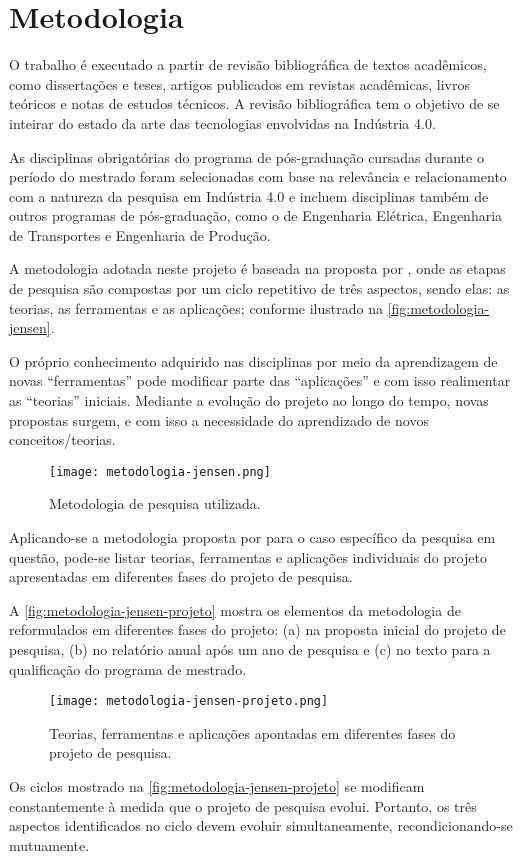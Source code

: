 \chapter{Metodologia}
\label{cha:metodologia}

	O trabalho é executado a partir de revisão bibliográfica de textos acadêmicos, como dissertações e teses, artigos publicados em revistas acadêmicas, livros teóricos e notas de estudos técnicos. A revisão bibliográfica tem o objetivo de se inteirar do estado da arte das tecnologias envolvidas na Indústria 4.0.
	
	As disciplinas obrigatórias do programa de pós-graduação cursadas durante o período do mestrado foram selecionadas com base na relevância e relacionamento com a natureza da pesquisa em Indústria 4.0 e incluem disciplinas também de outros programas de pós-graduação, como o de Engenharia Elétrica, Engenharia de Transportes e Engenharia de Produção.
	
	A metodologia adotada neste projeto é baseada na proposta por , onde as etapas de pesquisa são compostas por um ciclo repetitivo de três aspectos, sendo elas: as teorias, as ferramentas e as aplicações; conforme ilustrado na \autoref{fig:metodologia-jensen}.
	
	O próprio conhecimento adquirido nas disciplinas por meio da aprendizagem de novas ``ferramentas'' pode modificar parte das ``aplicações'' e com isso realimentar as ``teorias'' iniciais. Mediante a evolução do projeto ao longo do tempo, novas propostas surgem, e com isso a necessidade do aprendizado de novos conceitos/teorias.

	\begin{figure}[htb]
		\centering
		\caption{Metodologia de pesquisa utilizada.}
		\label{fig:metodologia-jensen}
		\texttt{[image: metodologia-jensen.png]}
	\end{figure}

	Aplicando-se a metodologia proposta por  para o caso específico da pesquisa em questão, pode-se listar teorias, ferramentas e aplicações individuais do projeto apresentadas em diferentes fases do projeto de pesquisa.
	
	A \autoref{fig:metodologia-jensen-projeto} mostra os elementos da metodologia de  reformulados em diferentes fases do projeto: (a) na proposta inicial do projeto de pesquisa, (b) no relatório anual após um ano de pesquisa e (c) no texto para a qualificação do programa de mestrado.
	
	\begin{figure}[htb]
		\centering
		\caption{Teorias, ferramentas e aplicações apontadas em diferentes fases do projeto de pesquisa.}
		\label{fig:metodologia-jensen-projeto}
		\texttt{[image: metodologia-jensen-projeto.png]}
	\end{figure}
	
	 Os ciclos mostrado na \autoref{fig:metodologia-jensen-projeto} se modificam constantemente à medida que o projeto de pesquisa evolui. Portanto, os três aspectos identificados no ciclo devem evoluir simultaneamente, recondicionando-se mutuamente.

